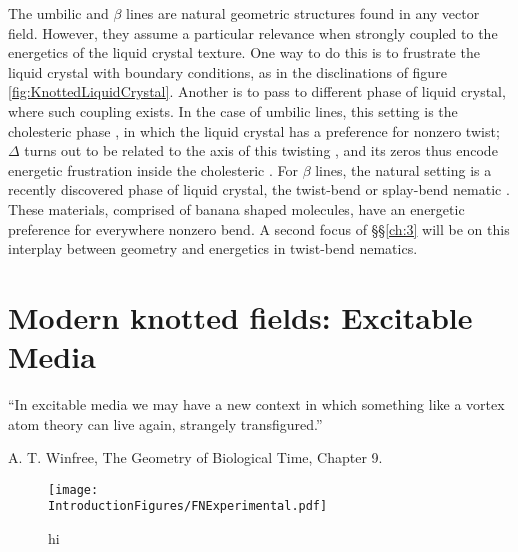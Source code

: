The umbilic and $\beta$ lines are natural geometric structures found in any vector field. However, they assume a particular relevance when strongly coupled to the energetics of the liquid crystal texture. One way to do this is to frustrate the liquid crystal with boundary conditions, as in the disclinations of figure \ref{fig:KnottedLiquidCrystal}. Another is to pass to different phase of liquid crystal, where such coupling exists. In the case of umbilic lines, this setting is the cholesteric phase \citep{Bellar2014}, in which the liquid crystal has a preference for nonzero twist; $\Delta$ turns out to be related to the axis of this twisting \citep{AlexanderBook}, and its zeros thus encode energetic frustration inside the cholesteric \citep{Machon2016b}. For $\beta$ lines, the natural setting is a recently discovered phase of liquid crystal, the twist-bend or splay-bend nematic \citep{Lavrentovich2018}. These materials, comprised of banana shaped molecules, have an energetic preference for everywhere nonzero bend. A second focus of \S\S\ref{ch:3} will be on this interplay between geometry and energetics in twist-bend nematics. 

\section{Modern knotted fields: Excitable Media}

\setlength{\epigraphwidth}{5in} 
\epigraph{``In excitable media we may have a new context in which something like a vortex atom theory can live again, strangely transfigured.''}{A. T. Winfree, The Geometry of Biological Time, Chapter 9.}
\begin{figure}[htbp]
\centering
\texttt{[image: \\IntroductionFigures/FNExperimental.pdf]}
\caption{hi }
\label{fig:FNExperimental}
\end{figure}

